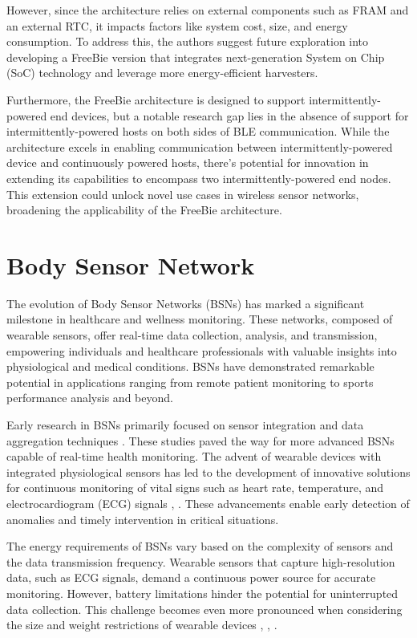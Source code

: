\noindent However, since the architecture relies on external components such as FRAM and an external RTC, it impacts factors like system cost, size, and energy consumption. To address this, the authors suggest future exploration into developing a FreeBie version that integrates next-generation System on Chip (SoC) technology and leverage more energy-efficient harvesters.
\vspace{1\baselineskip}

\noindent Furthermore, the FreeBie architecture is designed to support intermittently-powered end devices, but a notable research gap lies in the absence of support for intermittently-powered hosts on both sides of BLE communication. While the architecture excels in enabling communication between intermittently-powered device and continuously powered hosts, there's potential for innovation in extending its capabilities to encompass two intermittently-powered end nodes. This extension could unlock novel use cases in wireless sensor networks, broadening the applicability of the FreeBie architecture.

\section{Body Sensor Network}
The evolution of Body Sensor Networks (BSNs) has marked a significant milestone in healthcare and wellness monitoring. These networks, composed of wearable sensors, offer real-time data collection, analysis, and transmission, empowering individuals and healthcare professionals with valuable insights into physiological and medical conditions. BSNs have demonstrated remarkable potential in applications ranging from remote patient monitoring to sports performance analysis and beyond.
\vspace{1\baselineskip}

\noindent Early research in BSNs primarily focused on sensor integration and data aggregation techniques \cite{5678072}. These studies paved the way for more advanced BSNs capable of real-time health monitoring. The advent of wearable devices with integrated physiological sensors has led to the development of innovative solutions for continuous monitoring of vital signs such as heart rate, temperature, and electrocardiogram (ECG) signals \cite{BSNreview}, \cite{6555588}. These advancements enable early detection of anomalies and timely intervention in critical situations.
\vspace{1\baselineskip}

\noindent The energy requirements of BSNs vary based on the complexity of sensors and the data transmission frequency. Wearable sensors that capture high-resolution data, such as ECG signals, demand a continuous power source for accurate monitoring. However, battery limitations hinder the potential for uninterrupted data collection. This challenge becomes even more pronounced when considering the size and weight restrictions of wearable devices \cite{WANG2020112410}, \cite{4755157}, \cite{6755575}.
\vspace{1\baselineskip}

